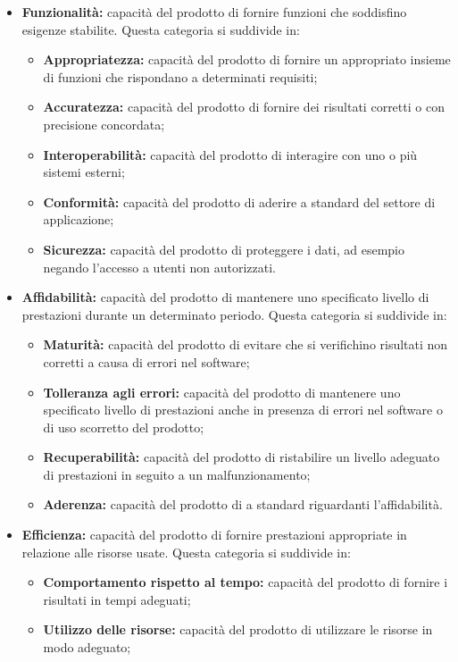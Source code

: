 \documentclass{scalatekids-article}
\begin{document}
\begin{itemize}
\item{\textbf{Funzionalità:} capacità del prodotto di fornire funzioni che soddisfino esigenze stabilite. Questa categoria si suddivide in:}
  \begin{itemize}
  \item{\textbf{Appropriatezza:} capacità del prodotto di fornire un appropriato insieme di funzioni che rispondano a determinati requisiti;}
  \item{\textbf{Accuratezza:} capacità del prodotto di fornire dei risultati corretti o con precisione concordata;}
  \item{\textbf{Interoperabilità:} capacità del prodotto di interagire con uno o più sistemi esterni;}
  \item{\textbf{Conformità:} capacità del prodotto di aderire a standard del settore di applicazione;}
  \item{\textbf{Sicurezza:} capacità del prodotto di proteggere i dati, ad esempio negando l'accesso a utenti non autorizzati.}
  \end{itemize}
\item{\textbf{Affidabilità:} capacità del prodotto di mantenere uno specificato livello di prestazioni durante un determinato periodo. Questa categoria si suddivide in:}
  \begin{itemize}
  \item{\textbf{Maturità:} capacità del prodotto di evitare che si verifichino risultati non corretti a causa di errori nel software;}
  \item{\textbf{Tolleranza agli errori:} capacità del prodotto di mantenere uno specificato livello di prestazioni anche in presenza di errori nel software o di uso scorretto del prodotto;}
  \item{\textbf{Recuperabilità:} capacità del prodotto di ristabilire un livello adeguato di prestazioni in seguito a un malfunzionamento;}
  \item{\textbf{Aderenza:} capacità del prodotto di a standard riguardanti l'affidabilità.}
  \end{itemize}
\item{\textbf{Efficienza:} capacità del prodotto di fornire prestazioni appropriate in relazione alle risorse usate. Questa categoria si suddivide in:}
  \begin{itemize}
  \item{\textbf{Comportamento rispetto al tempo:} capacità del prodotto di fornire i risultati in tempi adeguati;}
  \item{\textbf{Utilizzo delle risorse:} capacità del prodotto di utilizzare le risorse in modo adeguato;}

\end{itemize}
\end{itemize}
\end{document}
